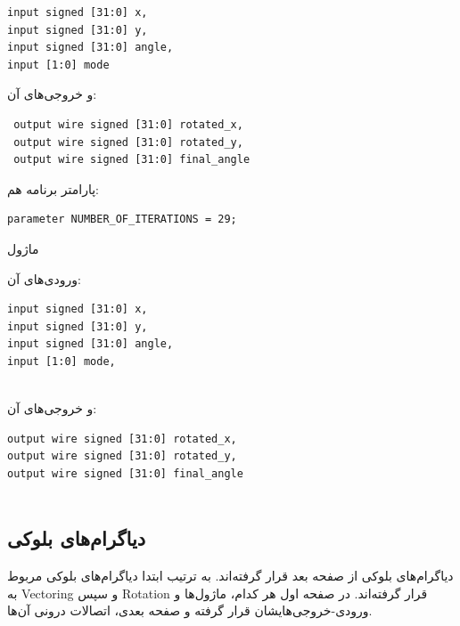 \documentclass[12pt,titlepage,a4page , tikz , multi,table , svgnames,xcdraw]{article}
\begin{document}
\begin{latin}
\begin{verbatim}
input signed [31:0] x,
input signed [31:0] y,
input signed [31:0] angle,
input [1:0] mode
\end{verbatim}
\end{latin}

و خروجی‌های آن:

\begin{latin}
\begin{verbatim}
 output wire signed [31:0] rotated_x,
 output wire signed [31:0] rotated_y,
 output wire signed [31:0] final_angle
\end{verbatim}
\end{latin}


پارامتر برنامه هم:

\begin{latin}
\begin{verbatim}
parameter NUMBER_OF_ITERATIONS = 29;
\end{verbatim}
\end{latin}


\hrulefill

ماژول 

ورودی‌های آن:

\begin{latin}

\begin{verbatim}
input signed [31:0] x,
input signed [31:0] y,
input signed [31:0] angle,
input [1:0] mode,
   
\end{verbatim}

\end{latin}


و خروجی‌های آن:


\begin{latin}

\begin{verbatim}
output wire signed [31:0] rotated_x,
output wire signed [31:0] rotated_y,
output wire signed [31:0] final_angle
   
\end{verbatim}
\end{latin}

\newpage

\subsection{دیاگرام‌های بلوکی}


دیاگرام‌های بلوکی از صفحه بعد قرار گرفته‌اند. به ترتیب ابتدا دیاگرام‌های بلوکی مربوط به Vectoring و سپس Rotation قرار گرفته‌اند. در صفحه اول هر کدام، ماژول‌ها و ورودی-خروجی‌هایشان قرار گرفته و صفحه بعدی، اتصالات درونی آن‌ها.
\end{document}
